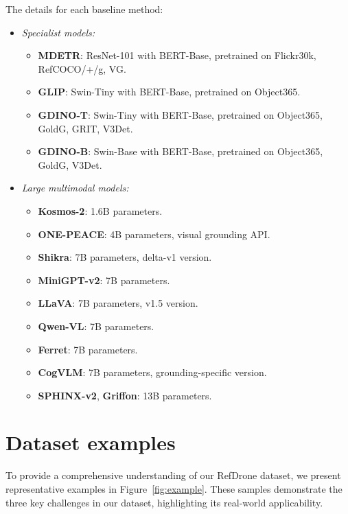 The details for each baseline method:
\begin{itemize} 
\item \textit{Specialist models:} 
\begin{itemize} 
\item \textbf{MDETR}: ResNet-101 with BERT-Base, \newline
pretrained on Flickr30k, RefCOCO/+/g, VG.
\item \textbf{GLIP}: Swin-Tiny with BERT-Base, \newline
pretrained on Object365.
\item \textbf{GDINO-T}: Swin-Tiny with BERT-Base, \newline
pretrained on Object365, GoldG, GRIT, V3Det.
\item \textbf{GDINO-B}: Swin-Base with BERT-Base, \newline
pretrained on Object365, GoldG, V3Det.
\end{itemize} 
\item \textit{Large multimodal models:} 
\begin{itemize} 
\item \textbf{Kosmos-2}: 1.6B parameters.
\item \textbf{ONE-PEACE}: 4B parameters, visual grounding API.
\item \textbf{Shikra}: 7B parameters, delta-v1 version.
\item \textbf{MiniGPT-v2}: 7B parameters.
\item \textbf{LLaVA}: 7B parameters, v1.5 version.
\item \textbf{Qwen-VL}: 7B parameters.
\item \textbf{Ferret}: 7B parameters.
\item \textbf{CogVLM}: 7B parameters, grounding-specific version.
\item \textbf{SPHINX-v2}, \textbf{Griffon}: 13B parameters.
\end{itemize} \end{itemize}

    


\section{Dataset examples}
\label{sup:images}
To provide a comprehensive understanding of our RefDrone dataset, we present representative examples in Figure~\ref{fig:example}. These samples demonstrate the three key challenges in our dataset, highlighting its real-world applicability.


